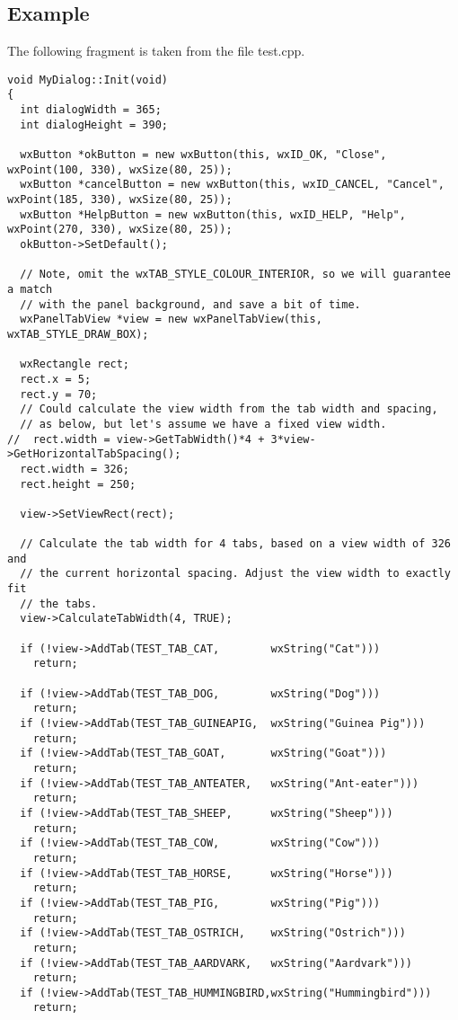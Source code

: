 \subsection{Example}

The following fragment is taken from the file test.cpp.

{\small
\begin{verbatim}
void MyDialog::Init(void)
{
  int dialogWidth = 365;
  int dialogHeight = 390;
  
  wxButton *okButton = new wxButton(this, wxID_OK, "Close", wxPoint(100, 330), wxSize(80, 25));
  wxButton *cancelButton = new wxButton(this, wxID_CANCEL, "Cancel", wxPoint(185, 330), wxSize(80, 25));
  wxButton *HelpButton = new wxButton(this, wxID_HELP, "Help", wxPoint(270, 330), wxSize(80, 25));
  okButton->SetDefault();

  // Note, omit the wxTAB_STYLE_COLOUR_INTERIOR, so we will guarantee a match
  // with the panel background, and save a bit of time.
  wxPanelTabView *view = new wxPanelTabView(this, wxTAB_STYLE_DRAW_BOX);

  wxRectangle rect;
  rect.x = 5;
  rect.y = 70;
  // Could calculate the view width from the tab width and spacing,
  // as below, but let's assume we have a fixed view width.
//  rect.width = view->GetTabWidth()*4 + 3*view->GetHorizontalTabSpacing();
  rect.width = 326;
  rect.height = 250;
  
  view->SetViewRect(rect);

  // Calculate the tab width for 4 tabs, based on a view width of 326 and
  // the current horizontal spacing. Adjust the view width to exactly fit
  // the tabs.
  view->CalculateTabWidth(4, TRUE);

  if (!view->AddTab(TEST_TAB_CAT,        wxString("Cat")))
    return;

  if (!view->AddTab(TEST_TAB_DOG,        wxString("Dog")))
    return;
  if (!view->AddTab(TEST_TAB_GUINEAPIG,  wxString("Guinea Pig")))
    return;
  if (!view->AddTab(TEST_TAB_GOAT,       wxString("Goat")))
    return;
  if (!view->AddTab(TEST_TAB_ANTEATER,   wxString("Ant-eater")))
    return;
  if (!view->AddTab(TEST_TAB_SHEEP,      wxString("Sheep")))
    return;
  if (!view->AddTab(TEST_TAB_COW,        wxString("Cow")))
    return;
  if (!view->AddTab(TEST_TAB_HORSE,      wxString("Horse")))
    return;
  if (!view->AddTab(TEST_TAB_PIG,        wxString("Pig")))
    return;
  if (!view->AddTab(TEST_TAB_OSTRICH,    wxString("Ostrich")))
    return;
  if (!view->AddTab(TEST_TAB_AARDVARK,   wxString("Aardvark")))
    return;
  if (!view->AddTab(TEST_TAB_HUMMINGBIRD,wxString("Hummingbird")))
    return;
    

\end{verbatim}}
